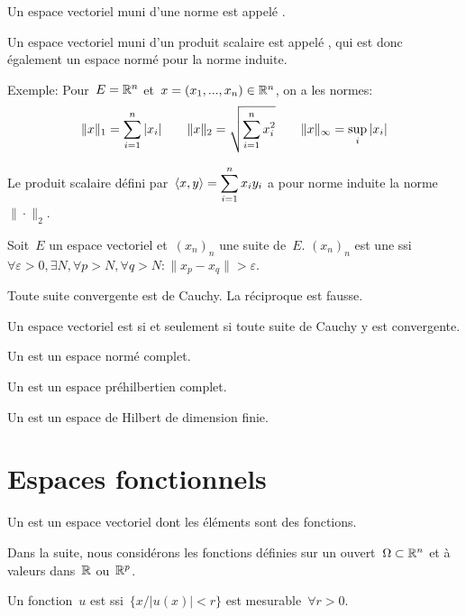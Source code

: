 Un espace vectoriel muni d'une norme est appelé .

Un espace vectoriel muni d'un produit scalaire est appelé , 
qui est donc également un espace normé pour la norme induite.

\medskip
Exemple:
Pour~$E = \mathbb R^n$ et~$x = (x_1, ..., x_n)\in\mathbb R^n$, on a les normes:
\[
\|x\|_1=\displaystyle\sum_{i=1}^n|x_i| \qquad
\|x\|_2= \sqrt{\displaystyle\sum_{i=1}^nx_i^2} \qquad
\|x\|_\infty=\sup_i|x_i|
\]

Le produit scalaire défini par~$\langle x,y\rangle=\displaystyle\sum_{i=1}^nx_iy_i$ a pour norme induite
la norme~$\|\cdot\|_2$.

\medskip
Soit~$E$ un espace vectoriel et~$(x_n)_n$ une suite de~$E$. 
$(x_n)_n$ est une  ssi 
$\forall\varepsilon>0, \exists N, \forall p> N, \forall q> N: \|x_p-x_q\|>\varepsilon$.

Toute suite convergente est de Cauchy. La réciproque est fausse.

Un espace vectoriel est  si et seulement si toute suite de Cauchy y est convergente.

Un  est un espace normé complet.

Un  est un espace préhilbertien complet.

Un  est un espace de Hilbert 
de dimension finie.






\medskip
\section*{Espaces fonctionnels}

Un  est un espace vectoriel dont les éléments sont des
fonctions.

Dans la suite, nous considérons les fonctions définies sur un ouvert~$\Omega\subset\mathbb R^n$ et à
valeurs dans~$\mathbb R$ ou~$\mathbb R^p$.

Un fonction~$u$ est  ssi~$\{x/ |u(x)|<r\}$ est mesurable~$\forall r>0$.

